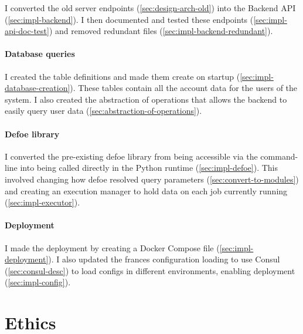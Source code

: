 \documentclass[12pt, letterpaper]{article}
\begin{document}
\begin{flushleft}
I converted the old server endpoints (\ref{sec:design-arch-old}) into the Backend API (\ref{sec:impl-backend}). I then documented and tested these endpoints (\ref{sec:impl-api-doc-test}) and removed redundant files (\ref{sec:impl-backend-redundant}).
\end{flushleft}

\paragraph{Database queries}

\begin{flushleft}
I created the table definitions and made them create on startup (\ref{sec:impl-database-creation}). These tables contain all the account data for the users of the system. I also created the abstraction of operations that allows the backend to easily query user data (\ref{sec:abstraction-of-operations}).
\end{flushleft}

\paragraph{Defoe library}

\begin{flushleft}
I converted the pre-existing defoe library from being accessible via the command-line into being called directly in the Python runtime (\ref{sec:impl-defoe}). This involved changing how defoe resolved query parameters (\ref{sec:convert-to-modules}) and creating an execution manager to hold data on each job currently running (\ref{sec:impl-executor}).
\end{flushleft}

\paragraph{Deployment}

\begin{flushleft}
I made the deployment by creating a Docker Compose file (\ref{sec:impl-deployment}). I also updated the frances configuration loading to use Consul (\ref{sec:consul-desc}) to load configs in different environments, enabling deployment (\ref{sec:impl-config}).
\end{flushleft}

\section{Ethics}\label{sec:ethics}
\end{document}
